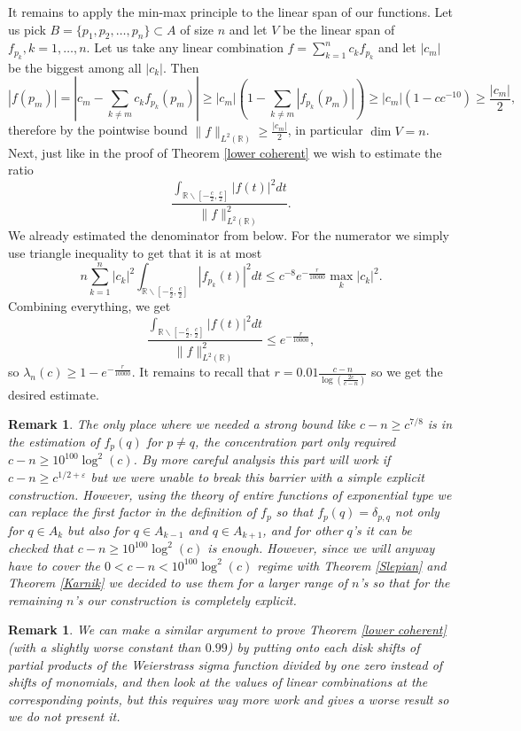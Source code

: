 \documentclass[12pt]{amsart}
\numberwithin{equation}{section}
\newcommand{\R}{\mathbb{R}}
\newcommand{\eps}{\varepsilon}
\newtheorem{remark}[Thm]{Remark}
\begin{document}
It remains to apply the min-max principle to the linear span of our functions. Let us pick $B=\{p_1, p_2, \ldots , p_n\}\subset A$ of size $n$ and let $V$ be the linear span of $f_{p_k}, k = 1,\ldots , n$. Let us take any linear combination $f = \sum_{k=1}^n c_kf_{p_k}$ and let $|c_m|$ be the biggest among all $|c_k|$. Then 
$$|f(p_m)| = |c_m - \sum_{k\neq m} c_k f_{p_k}(p_m)| \ge |c_m|(1 - \sum_{k\neq m} |f_{p_k}(p_m)|)\ge |c_m|(1-c c^{-10}) \ge \frac{|c_m|}{2},$$
therefore by the pointwise bound $\|f\|_{L^2(\R)}\ge \frac{|c_m|}{2}$, in particular $\dim V = n$. Next, just like in the proof of Theorem \ref{lower coherent} we wish to estimate the ratio
$$\frac{\int_{\R\backslash[-\frac{c}{2},\frac{c}{2}]} |f(t)|^2dt}{\|f\|^2_{L^2(\R)}}.$$
We already estimated the denominator from below. For the numerator we simply use triangle inequality to get that it is at most
$$n\sum_{k=1}^n |c_k|^2\int_{\R\backslash[-\frac{c}{2},\frac{c}{2}]} |f_{p_k}(t)|^2dt \le c^{-8}e^{-\frac{r}{10000}}\max_{k} |c_k|^2.$$
Combining everything, we get
$$\frac{\int_{\R\backslash[-\frac{c}{2},\frac{c}{2}]} |f(t)|^2dt}{\|f\|^2_{L^2(\R)}} \le e^{-\frac{r}{10000}},$$
so $\lambda_n(c) \ge 1 - e^{-\frac{r}{10000}}$. It remains to recall that $r = 0.01 \frac{c-n}{\log(\frac{2c}{c-n})}$ so we get the desired estimate.
\begin{remark}
The only place where we needed a strong bound like $c-n\ge c^{7/8}$ is in the estimation of $f_p(q)$ for $p\neq q$, the concentration part only required $c-n\ge 10^{100}\log^2(c)$. By more careful analysis this part will work if $c-n \ge c^{1/2 + \eps}$ but we were unable to break this barrier with a simple explicit construction. However, using the theory of entire functions of exponential type we can replace the first factor in the definition of $f_p$  so that $f_p(q) = \delta_{p, q}$ not only for $q\in A_k$ but also for $q\in A_{k-1}$ and $q\in A_{k+1}$, and for other $q$'s it can be checked that $c-n\ge 10^{100}\log^2(c)$ is enough. However, since we will anyway have to cover the $0 < c-n < 10^{100}\log^2(c)$ regime with Theorem \ref{Slepian} and Theorem \ref{Karnik} we decided to use them for a larger range of $n$'s so that for the remaining $n$'s our construction is completely explicit.
\end{remark}
\begin{remark}
We can make a similar argument to prove Theorem \ref{lower coherent} (with a slightly worse constant than $0.99$) by putting onto each disk shifts of partial products of the Weierstrass sigma function divided by one zero instead of shifts of monomials, and then look at the values of linear combinations at the corresponding points, but this requires way more work and gives a worse result so we do not present it.
\end{remark}
\end{document}
